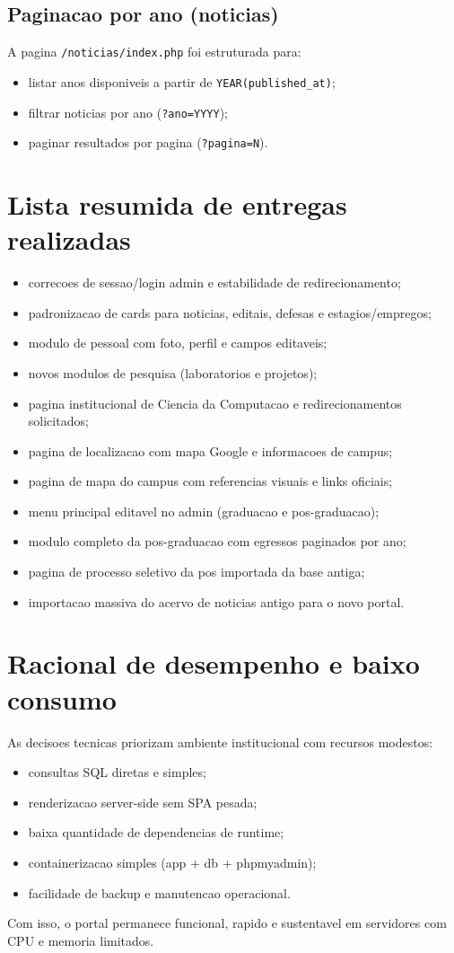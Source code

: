 \documentclass[12pt,a4paper]{article}
\begin{document}
\subsection{Paginacao por ano (noticias)}
A pagina \texttt{/noticias/index.php} foi estruturada para:
\begin{itemize}
    \item listar anos disponiveis a partir de \texttt{YEAR(published\_at)};
    \item filtrar noticias por ano (\texttt{?ano=YYYY});
    \item paginar resultados por pagina (\texttt{?pagina=N}).
\end{itemize}

\section{Lista resumida de entregas realizadas}
\begin{itemize}
    \item correcoes de sessao/login admin e estabilidade de redirecionamento;
    \item padronizacao de cards para noticias, editais, defesas e estagios/empregos;
    \item modulo de pessoal com foto, perfil e campos editaveis;
    \item novos modulos de pesquisa (laboratorios e projetos);
    \item pagina institucional de Ciencia da Computacao e redirecionamentos solicitados;
    \item pagina de localizacao com mapa Google e informacoes de campus;
    \item pagina de mapa do campus com referencias visuais e links oficiais;
    \item menu principal editavel no admin (graduacao e pos-graduacao);
    \item modulo completo da pos-graduacao com egressos paginados por ano;
    \item pagina de processo seletivo da pos importada da base antiga;
    \item importacao massiva do acervo de noticias antigo para o novo portal.
\end{itemize}

\section{Racional de desempenho e baixo consumo}
As decisoes tecnicas priorizam ambiente institucional com recursos modestos:
\begin{itemize}
    \item consultas SQL diretas e simples;
    \item renderizacao server-side sem SPA pesada;
    \item baixa quantidade de dependencias de runtime;
    \item containerizacao simples (app + db + phpmyadmin);
    \item facilidade de backup e manutencao operacional.
\end{itemize}
Com isso, o portal permanece funcional, rapido e sustentavel em servidores com CPU e memoria limitados.
\end{document}
